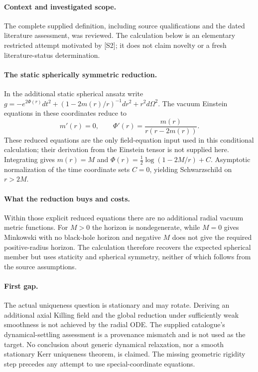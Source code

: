 \documentclass[11pt]{article}
\begin{document}
\paragraph{Context and investigated scope.} The complete supplied definition, including source qualifications and the dated literature assessment, was reviewed. The calculation below is an elementary restricted attempt motivated by [S2]; it does not claim novelty or a fresh literature-status determination.

\paragraph{The static spherically symmetric reduction.} In the additional static spherical ansatz write $g=-e^{2\Phi(r)}dt^2+(1-2m(r)/r)^{-1}dr^2+r^2d\Omega^2$. The vacuum Einstein equations in these coordinates reduce to
\[
 m'(r)=0,\qquad \Phi'(r)=\frac{m(r)}{r(r-2m(r))}.
\]
These reduced equations are the only field-equation input used in this conditional calculation; their derivation from the Einstein tensor is not supplied here. Integrating gives $m(r)=M$ and $\Phi(r)=\tfrac12\log(1-2M/r)+C$. Asymptotic normalization of the time coordinate sets $C=0$, yielding Schwarzschild on $r>2M$.

\paragraph{What the reduction buys and costs.} Within those explicit reduced equations there are no additional radial vacuum metric functions. For $M>0$ the horizon is nondegenerate, while $M=0$ gives Minkowski with no black-hole horizon and negative $M$ does not give the required positive-radius horizon. The calculation therefore recovers the expected spherical member but uses staticity and spherical symmetry, neither of which follows from the source assumptions.

\paragraph{First gap.} The actual uniqueness question is stationary and may rotate. Deriving an additional axial Killing field and the global reduction under sufficiently weak smoothness is not achieved by the radial ODE. The supplied catalogue's dynamical-settling assessment is a provenance mismatch and is not used as the target. No conclusion about generic dynamical relaxation, nor a smooth stationary Kerr uniqueness theorem, is claimed. The missing geometric rigidity step precedes any attempt to use special-coordinate equations.
\end{document}
